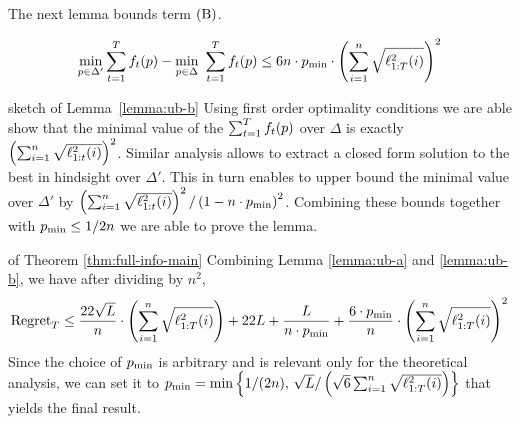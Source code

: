 The next lemma bounds term $\rB$.
\begin{lemma}\label{lemma:ub-b}
\begin{equation*}
\min_{p \in \Delta'} \sum_{t=1}^T f_t(p)  - \min_{p \in \Delta} \ \sum_{t=1}^T f_t(p) \leq 6 n \cdot p_{\text{min}} \cdot \left( \sum_{i=1}^n \sqrt{  \ell_{1:T}^2(i)} \right)^2
\end{equation*}
\end{lemma}
\begin{proofarg}{sketch of Lemma~\ref{lemma:ub-b}}
Using first order optimality conditions we are able show that the  minimal value of the $\sum_{t=1}^T f_t(p)$ over $\Delta$ is exactly $\left(\sum_{i=1}^n\sqrt{\ell_{1:t}^2(i)} \right)^2$.
Similar analysis allows to extract a closed form solution to the best in hindsight over $\Delta'$. This in turn enables to upper bound the minimal value over $\Delta'$ by
$\left(\sum_{i=1}^n\sqrt{\ell_{1:t}^2(i)} \right)^2/\left(1- n \cdot p_{\text{min}}\right)^2$. Combining these bounds together with $p_{\text{min}}\leq 1/2n$ we are able to prove the lemma.
%
\end{proofarg}

\begin{proofarg}{of Theorem \ref{thm:full-info-main}}
Combining Lemma \ref{lemma:ub-a} and \ref{lemma:ub-b}, we have after dividing by $n^2$,
\begin{equation*}
\text{Regret}_T \leq \frac{22\sqrt{L}}{n} \cdot \left( \sum_{i=1}^n \sqrt{ \ell_{1:T}^2(i) } \right) +22L+\frac{L}{n \cdot p_{\text{min}}}+ \frac{6 \cdot p_{\text{min}}}{n} \cdot \left( \sum_{i=1}^n \sqrt{  \ell_{1:T}^2(i)} \right)^2
\end{equation*}
Since the choice of $p_{\text{min}}$ is arbitrary and is relevant only for the theoretical analysis, we can set it to $p_{\text{min}} = \min \left\{1/(2n), \, \sqrt{L}/\left( \sqrt{6}  \sum_{i=1}^n \sqrt{  \ell_{1:T}^2(i)} \right) \right\}$ that yields the final result. 
\end{proofarg}